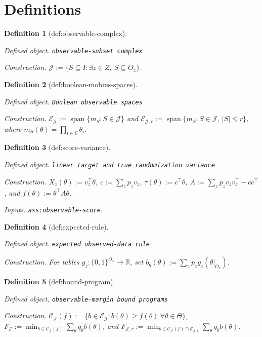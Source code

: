 \documentclass{article}
\newtheorem{definition}{Definition}
\begin{document}
\section{Definitions}

\begin{definition}[def:observable-complex]\label{def:observable-complex}
\par\smallskip\noindent\emph{Defined object.} \texttt{observable-\allowbreak{}subset complex}
\par\smallskip\noindent\emph{Construction.} \(\mathcal J:=\{S\subseteq I:\exists z\in Z,\ S\subseteq O_z\}\).
\end{definition}

\begin{definition}[def:boolean-mobius-spaces]\label{def:boolean-mobius-spaces}
\par\smallskip\noindent\emph{Defined object.} \texttt{Boolean observable spaces}
\par\smallskip\noindent\emph{Construction.} \(\mathcal E_{\mathcal J}:=\operatorname{span}\{m_S:S\in\mathcal J\}\) and \(\mathcal E_{\mathcal J,r}:=\operatorname{span}\{m_S:S\in\mathcal J,\ |S|\le r\}\), where \(m_S(\theta)=\prod_{i\in S}\theta_i\).
\end{definition}

\begin{definition}[def:score-variance]\label{def:score-variance}
\par\smallskip\noindent\emph{Defined object.} \texttt{linear target and true randomization variance}
\par\smallskip\noindent\emph{Construction.} \(X_z(\theta):=v_z^\top\theta\), \(c:=\sum_zp_zv_z\), \(\tau(\theta):=c^\top\theta\), \(A:=\sum_zp_zv_zv_z^\top-cc^\top\), and \(f(\theta):=\theta^\top A\theta\).
\par\smallskip\noindent\emph{Inputs.} \texttt{ass:\allowbreak{}observable-\allowbreak{}score}.
\end{definition}

\begin{definition}[def:expected-rule]\label{def:expected-rule}
\par\smallskip\noindent\emph{Defined object.} \texttt{expected observed-\allowbreak{}data rule}
\par\smallskip\noindent\emph{Construction.} For tables \(g_z:\{0,1\}^{O_z}\to\mathbb R\), set \(b_g(\theta):=\sum_zp_zg_z(\theta|_{O_z})\).
\end{definition}

\begin{definition}[def:bound-program]\label{def:bound-program}
\par\smallskip\noindent\emph{Defined object.} \texttt{observable-\allowbreak{}margin bound programs}
\par\smallskip\noindent\emph{Construction.} \(\mathcal C_{\mathcal J}(f):=\{b\in\mathcal E_{\mathcal J}:b(\theta)\ge f(\theta)\ \forall\theta\in\Theta\}\), \(F_{\mathcal J}:=\min_{b\in\mathcal C_{\mathcal J}(f)}\sum_\theta q_\theta b(\theta)\), and \(F_{\mathcal J,r}:=\min_{b\in\mathcal C_{\mathcal J}(f)\cap\mathcal E_{\mathcal J,r}}\sum_\theta q_\theta b(\theta)\).
\end{definition}
\end{document}
